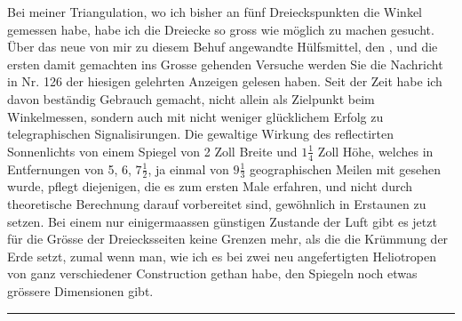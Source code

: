\par\noindent\hspace*{\parindent}Bei meiner Triangulation, wo ich bisher an fünf Dreieckspunkten die Winkel gemessen habe, habe ich die Dreiecke so gross wie möglich zu machen gesucht. Über das neue von mir zu diesem Behuf angewandte Hülfsmittel, den , und die ersten damit gemachten ins Grosse gehenden Versuche werden Sie die Nachricht in Nr. 126 der hiesigen gelehrten Anzeigen gelesen haben. Seit der Zeit habe ich davon beständig Gebrauch gemacht, nicht allein als Zielpunkt beim Winkelmessen, sondern auch mit nicht weniger glücklichem Erfolg zu telegraphischen Signalisirungen. Die gewaltige Wirkung des reflectirten Sonnenlichts von einem Spiegel von 2 Zoll Breite und $1\frac14$ Zoll Höhe, welches in Entfernungen von 5, 6, $7\frac12$, ja einmal von $9\frac13$ geographischen Meilen mit  gesehen wurde, pflegt diejenigen, die es zum ersten Male erfahren, und nicht durch theoretische Berechnung darauf vorbereitet sind, gewöhnlich in Erstaunen zu setzen. Bei einem nur einigermaassen günstigen Zustande der Luft gibt es jetzt für die Grösse der Dreiecksseiten keine Grenzen mehr, als die die Krümmung der Erde setzt, zumal wenn man, wie ich es bei zwei neu angefertigten Heliotropen von ganz verschiedener Construction gethan habe, den Spiegeln noch etwas grössere Dimensionen gibt.
\begin{center}\rule{3.5cm}{.4pt}\end{center}

